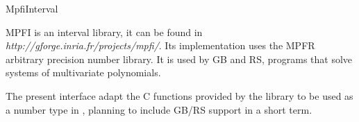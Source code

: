 %
%
%
%
% 
%

\begin{ccPkgDescription}{MpfiInterval \label{MpfiInterval}}

MPFI is an interval library, it can be found in
\emph{http://gforge.inria.fr/projects/mpfi/}.
Its implementation uses the MPFR arbitrary precision number library.
It is used by GB and RS, programs that solve systems of multivariate
polynomials.

The present interface adapt the C functions provided by the library to be
used as a number type in {\cgal}, planning to include GB/RS support in a
short term.


\end{ccPkgDescription}
